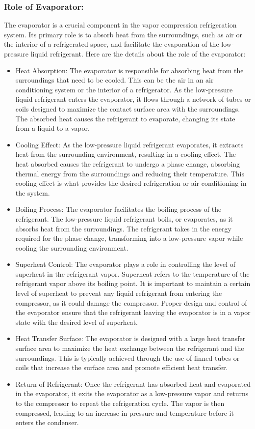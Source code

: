 \documentclass{article}
\begin{document}
\subsubsection*{Role of Evaporator:}
The evaporator is a crucial component in the vapor compression refrigeration system. Its primary role is to absorb heat from the surroundings, such as air or the interior of a refrigerated space, and facilitate the evaporation of the low-pressure liquid refrigerant. Here are the details about the role of the evaporator:

\begin{itemize}
  \item Heat Absorption: The evaporator is responsible for absorbing heat from the surroundings that need to be cooled. This can be the air in an air conditioning system or the interior of a refrigerator. As the low-pressure liquid refrigerant enters the evaporator, it flows through a network of tubes or coils designed to maximize the contact surface area with the surroundings. The absorbed heat causes the refrigerant to evaporate, changing its state from a liquid to a vapor.
  \item Cooling Effect: As the low-pressure liquid refrigerant evaporates, it extracts heat from the surrounding environment, resulting in a cooling effect. The heat absorbed causes the refrigerant to undergo a phase change, absorbing thermal energy from the surroundings and reducing their temperature. This cooling effect is what provides the desired refrigeration or air conditioning in the system.
  \item Boiling Process: The evaporator facilitates the boiling process of the refrigerant. The low-pressure liquid refrigerant boils, or evaporates, as it absorbs heat from the surroundings. The refrigerant takes in the energy required for the phase change, transforming into a low-pressure vapor while cooling the surrounding environment.
  \item Superheat Control: The evaporator plays a role in controlling the level of superheat in the refrigerant vapor. Superheat refers to the temperature of the refrigerant vapor above its boiling point. It is important to maintain a certain level of superheat to prevent any liquid refrigerant from entering the compressor, as it could damage the compressor. Proper design and control of the evaporator ensure that the refrigerant leaving the evaporator is in a vapor state with the desired level of superheat.
  \item Heat Transfer Surface: The evaporator is designed with a large heat transfer surface area to maximize the heat exchange between the refrigerant and the surroundings. This is typically achieved through the use of finned tubes or coils that increase the surface area and promote efficient heat transfer.
  \item Return of Refrigerant: Once the refrigerant has absorbed heat and evaporated in the evaporator, it exits the evaporator as a low-pressure vapor and returns to the compressor to repeat the refrigeration cycle. The vapor is then compressed, leading to an increase in pressure and temperature before it enters the condenser.
\end{itemize}
\end{document}
